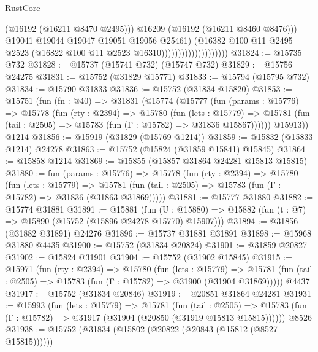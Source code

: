\begin{lexlean}{RustCore}
\begin{coremodule}
                                              (@16192 (@16211 @8470 @2495)))
                                            @16209
                                            (@16192 (@16211 @8460 @8476)))
                                          @19041
                                          @19044
                                          @19047
                                          @19051
                                          @19056
                                          @25461)
                                        (@16382
                                          @100
                                          @11
                                          @2495
                                          @2523
                                          (@16822 @100 @11 @2523 @16310))))))))))))))))))))
@31824 := @15735 @732
@31828 := @15737 (@15741 @732) (@15747 @732)
@31829 := @15756 @24275
@31831 := @15752 (@31829 @15771)
@31833 := @15794 (@15795 @732)
@31834 := @15790 @31833
@31836 := @15752 (@31834 @15820)
@31853 := @15751
    (fun (fn : @40) =>
    @31831
      (@15774
        (@15777
          (fun (params : @15776) =>
          @15778
            (fun (rty : @2394) =>
            @15780
              (fun (lets : @15779) =>
              @15781 (fun (tail : @2505) => @15783 (fun (Γ : @15782) => @31836 @15867))))))
        @15913))
    @1214
@31856 := @15919 (@31829 (@15769 @1214))
@31859 := @15832 (@15833 @1214) @24278
@31863 := @15752 (@15824 (@31859 @15841) @15845)
@31864 := @15858 @1214
@31869 := @15855 (@15857 @31864 @24281 @15813 @15815)
@31880 := fun (params : @15776) =>
  @15778
    (fun (rty : @2394) =>
    @15780
      (fun (lets : @15779) =>
      @15781 (fun (tail : @2505) => @15783 (fun (Γ : @15782) => @31836 (@31863 @31869)))))
@31881 := @15777 @31880
@31882 := @15774 @31881
@31891 := @15881
    (fun (U : @15880) => @15882 (fun (t : @7) => @15890 (@15752 (@15896 @24278 @15770) @15907)))
@31894 := @31856 (@31882 @31891) @24276
@31896 := @15737 @31881 @31891
@31898 := @15968 @31880 @4435
@31900 := @15752 (@31834 @20824)
@31901 := @31859 @20827
@31902 := @15824 @31901
@31904 := @15752 (@31902 @15845)
@31915 := @15971
    (fun (rty : @2394) =>
    @15780
      (fun (lets : @15779) =>
      @15781 (fun (tail : @2505) => @15783 (fun (Γ : @15782) => @31900 (@31904 @31869)))))
    @4437
@31917 := @15752 (@31834 @20846)
@31919 := @20851 @31864 @24281
@31931 := @15993
    (fun (lets : @15779) =>
    @15781
      (fun (tail : @2505) =>
      @15783 (fun (Γ : @15782) => @31917 (@31904 (@20850 (@31919 @15813 @15815))))))
    @8526
@31938 := @15752 (@31834 (@15802 (@20822 (@20843 (@15812 (@8527 @15815))))))

\end{coremodule}
\end{lexlean}
